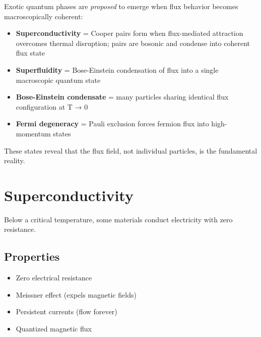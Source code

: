 \documentclass[
  11pt,
  letterpaper,
  twoside,
  openright]{book}
\providecommand{\tightlist}{%
  \setlength{\itemsep}{0pt}\setlength{\parskip}{0pt}}
\begin{document}
\begin{tcolorbox}[enhanced jigsaw, leftrule=.75mm, title=\textcolor{quarto-callout-note-color}{\faInfo}\hspace{0.5em}{How FTD Proposes Exotic States {[}CONJECTURE{]}}, bottomrule=.15mm, opacityback=0, coltitle=black, arc=.35mm, colframe=quarto-callout-note-color-frame, colbacktitle=quarto-callout-note-color!10!white, colback=white, titlerule=0mm, breakable, bottomtitle=1mm, toptitle=1mm, rightrule=.15mm, toprule=.15mm, left=2mm, opacitybacktitle=0.6]

Exotic quantum phases are \emph{proposed} to emerge when flux behavior
becomes macroscopically coherent:

\begin{itemize}
\tightlist
\item
  \textbf{Superconductivity} = Cooper pairs form when flux-mediated
  attraction overcomes thermal disruption; pairs are bosonic and
  condense into coherent flux state
\item
  \textbf{Superfluidity} = Bose-Einstein condensation of flux into a
  single macroscopic quantum state
\item
  \textbf{Bose-Einstein condensate} = many particles sharing identical
  flux configuration at T → 0
\item
  \textbf{Fermi degeneracy} = Pauli exclusion forces fermion flux into
  high-momentum states
\end{itemize}

These states reveal that the flux field, not individual particles, is
the fundamental reality.

\end{tcolorbox}

\section{Superconductivity}\label{superconductivity}

Below a critical temperature, some materials conduct electricity with
zero resistance.

\subsection{Properties}\label{properties-5}

\begin{itemize}
\tightlist
\item
  Zero electrical resistance
\item
  Meissner effect (expels magnetic fields)
\item
  Persistent currents (flow forever)
\item
  Quantized magnetic flux
\end{itemize}
\end{document}
